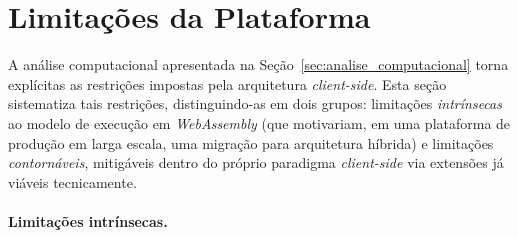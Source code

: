 \section{Limitações da Plataforma}
\label{sec:limitacoes}

A análise computacional apresentada na Seção~\ref{sec:analise_computacional} torna explícitas as restrições impostas pela arquitetura \textit{client-side}. Esta seção sistematiza tais restrições, distinguindo-as em dois grupos: limitações \textit{intrínsecas} ao modelo de execução em \textit{WebAssembly} (que motivariam, em uma plataforma de produção em larga escala, uma migração para arquitetura híbrida) e limitações \textit{contornáveis}, mitigáveis dentro do próprio paradigma \textit{client-side} via extensões já viáveis tecnicamente.

\paragraph{Limitações intrínsecas.}

